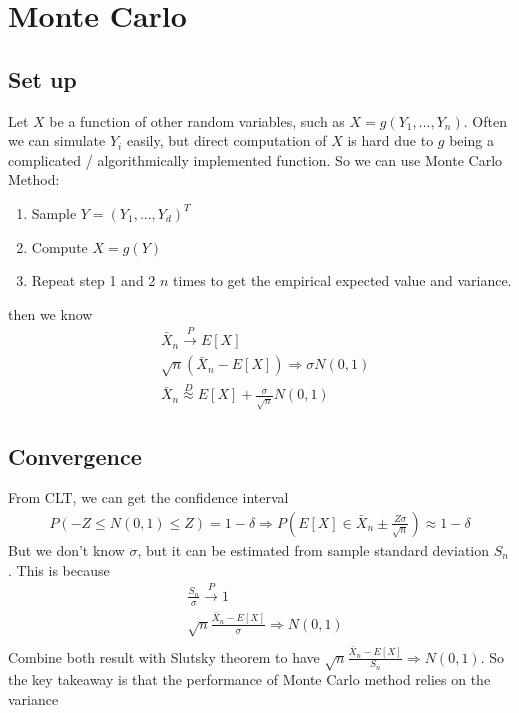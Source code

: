 \section{Monte Carlo}
\subsection{Set up} 
Let $X$ be a function of other random variables, such as $X = g(Y_1, ..., Y_n)$. Often we can simulate $Y_i$ easily, but direct computation of $X$ is hard due to $g$ being a complicated / algorithmically implemented function. So we can use Monte Carlo Method: 
    \begin{enumerate}
        \item Sample $Y = (Y_1, ..., Y_d)^T$ 
        \item Compute $X = g(Y)$
        \item Repeat step 1 and 2 $n$ times to get the empirical expected value and variance. 
    \end{enumerate}
then we know 
    \begin{align*}
        & \bar{X}_n \overset{P}{\to} E[X] \tag{LLN} \\
        & \sqrt{n}(\bar{X}_n - E[X]) \Rightarrow \sigma N(0,1) \tag{CLT} \\
        & \bar{X}_n \overset{D}{\approx} E[X] + \frac{\sigma}{\sqrt{n}}N(0,1) \tag{Informal CLT} 
    \end{align*}

\subsection{Convergence} 
From CLT, we can get the confidence interval
    \begin{align*}
        P(-Z \leq N(0,1) \leq Z) = 1 - \delta \Rightarrow P(E[X] \in \bar{X}_n \pm \frac{Z \sigma}{\sqrt{n}}) \approx 1 - \delta
    \end{align*}
But we don't know $\sigma$, but it can be estimated from sample standard deviation $S_n$. This is because 
    \begin{align*}
        & \frac{S_n}{\sigma} \overset{P}{\to} 1 \tag{LLN}\\
        & \sqrt{n} \frac{\bar{X}_n - E[X]}{\sigma} \Rightarrow N(0,1) \tag{CLT} \\
    \end{align*}
Combine both result with Slutsky theorem to have $\sqrt{n} \frac{\bar{X}_n - E[X]}{S_n} \Rightarrow N(0,1)$. So the key takeaway is that the performance of Monte Carlo method relies on the variance 

